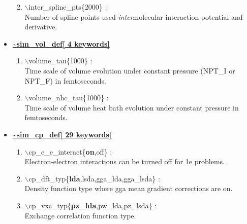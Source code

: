 \documentclass[12pt]{article}
\begin{document}
\begin{itemize}
\begin{enumerate}
 \vspace{0.15in} \Large
 \item   $\backslash$inter\_spline\_pts\{2000\} : \\
   \large
    Number of spline points used {\it inter}molecular interaction 
    potential and derivative.

\end{enumerate}


\clearpage
\huge
\item[] \underline{\bf \~{}sim\_vol\_def[ 4 keywords]}
\begin{enumerate}

 \vspace{0.15in} \Large
 \item  $\backslash$volume\_tau\{1000\} : \\
    \large
     Time scale of volume evolution
     under constant pressure (NPT\_I or NPT\_F) in femtoseconds.
  
 \vspace{0.15in} \Large
 \item  $\backslash$volume\_nhc\_tau\{1000\} : \\
    \large
     Time scale of volume 
     heat bath evolution under constant pressure in femtoseconds.

\end{enumerate}

\clearpage
\huge
\item[] \underline{\bf \~{}sim\_cp\_def[ 29 keywords]}
\begin{enumerate}

 \vspace{0.15in} \Large
 \item  $\backslash$cp\_e\_e\_interact\{{\bf on},off\} : \\
    \large
     Electron-electron interactions can be turned off for 1e problems.

 \vspace{0.15in} \Large
 \item  $\backslash$cp\_dft\_typ\{{\bf lda},lsda,gga\_lda,gga\_lsda\} : \\
    \large
     Density function type where gga mean gradient corrections are on.

 \vspace{0.15in} \Large
 \item  $\backslash$cp\_vxc\_typ\{{\bf pz\_lda},pw\_lda,pz\_lsda\} : \\
    \large
     Exchange correlation function type.


\end{enumerate}
\end{itemize}
\end{document}
